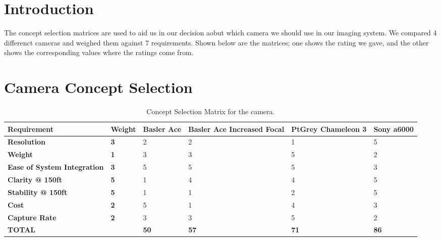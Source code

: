 \documentclass[]{auvsi_doc}
\begin{document}
\begin{AUVSITitlePage}
\begin{artifacttable}
\end{artifacttable}
\end{AUVSITitlePage}

\section{Introduction}

The concept selection matrices are used to aid us in our decision aobut which camera we should use in our imaging system.
We compared 4 differenct cameras and weighed them against 7 requirements.
Shown below are the matrices; one shows the rating we gave, and the other shows the corresponding values where the ratings come from.

\section{Camera Concept Selection}
\begin{table}[H]
\centering
\caption{Concept Selection Matrix for the camera.}
\begin{tabular}{|p{3.45cm}|p{1.5cm}|p{1.55cm}|p{2.5cm}|p{2.5cm}|p{2.0cm}|}
\hline
\rowcolor[HTML]{C0C0C0}
{\color[HTML]{000000} \textbf{Requirement}} & {\color[HTML]{000000} \textbf{Weight}} & {\color[HTML]{000000} \textbf{Basler Ace}} & {\color[HTML]{000000} \textbf{Basler Ace Increased Focal}} & {\color[HTML]{000000} \textbf{PtGrey Chameleon 3}} & {\color[HTML]{000000} \textbf{Sony a6000}}\\ \hline
{\color[HTML]{000000} \textbf{Resolution}}	& \textbf{3}	& 2	& 2	& 1	& 5 \\ \hline
{\color[HTML]{000000} \textbf{Weight}}	&	\textbf{1}	&	3 &	3 	& 	5 	&	2 \\ \hline
{\color[HTML]{000000} \textbf{Ease of System Integration}}	&	\textbf{3} 	&	5 	& 	5 	& 	5 	& 	3 \\ \hline
{\color[HTML]{000000} \textbf{Clarity @ 150ft}}	&	\textbf{5} 	&	1 	& 	4	&	4	&	5 \\ \hline
{\color[HTML]{000000} \textbf{Stability @ 150ft}}	&	\textbf{5} 	&	1 	&	1 	&	2	&	5 \\ \hline
{\color[HTML]{000000} \textbf{Cost}}	&	\textbf{2} 	&	5 	&	1 	&	4	&	3 \\ \hline
{\color[HTML]{000000} \textbf{Capture Rate}}	&	\textbf{2} 	&	3 	&	3 	&	5 	&	2 \\ \hline
\rowcolor[HTML]{C0C0C0}
{\color[HTML]{000000} \textbf{TOTAL}}	&	&	{\color[HTML]{000000} \textbf{50}}	&	{\color[HTML]{000000} \textbf{57}}	&	{\color[HTML]{000000} \textbf{71}}	&	{\color[HTML]{000000} \textbf{86}} \\ \hline
\end{tabular}
\end{table}
\end{document}
